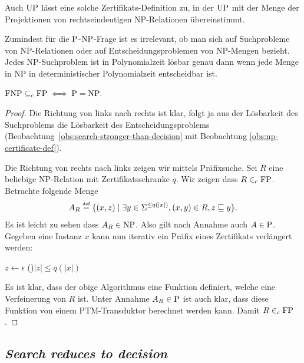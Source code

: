 Auch $\UP$ lässt eine solche Zertifikats-Definition zu, in der $\UP$ mit der Menge der Projektionen von rechtseindeutigen NP-Relationen übereinstimmt.

Zumindest für die $\P$-$\NP$-Frage ist es irrelevant, ob man sich auf Suchprobleme von NP-Relationen oder auf Entscheidungsproblemen von NP-Mengen bezieht. Jedes NP-Suchproblem ist in Polynomialzeit lösbar genau dann wenn jede Menge in NP in deterministischer Polynomialzeit entscheidbar ist.
\begin{lemma}\label{lemma:equiv-p-np-question}
    $\FNP\subseteqc \FP \iff \P = \NP.$
\end{lemma}
\begin{proof}
    Die Richtung von links nach rechts ist klar, folgt ja aus der Lösbarkeit des Suchproblems die Lösbarkeit des Entscheidungsproblems (Beobachtung~\ref{obs:search-stronger-than-decision} mit Beobachtung \ref{obs:np-certificate-def}).

    Die Richtung von rechts nach links zeigen wir mittels Präfixsuche. Sei $R$ eine beliebige NP-Relation mit Zertifikatsschranke $q$. Wir zeigen dass $R\inc\FP$.
    Betrachte folgende Menge
    \[ A_R \defeq \{ (x,z) \mid \exists y\in\Sigma^{\leq q(|x|)}, (x,y)\in R, z\sqsubseteq y \}. \]
    Es ist leicht zu sehen dass $A_R\in\NP$. Also gilt nach Annahme auch $A\in\P$.
    Gegeben eine Instanz $x$ kann nun iterativ ein Präfix eines Zertifikats verlängert werden:\\
    \begin{algorithm}[H]
        $z\gets\epsilon$\;
        \While(){$|z|\leq q(|x|)$}
        {
            \Else{\Reject}
        }
        \Reject
    \end{algorithm}
    \noindent
    Es ist klar, dass der obige Algorithmus eine Funktion definiert, welche eine Verfeinerung von $R$ ist.
    Unter Annahme $A_R\in\P$ ist auch klar, dass diese Funktion von einem PTM-Transduktor berechnet werden kann. Damit $R\inc\FP$.
\end{proof}

\subsection*{\emph{Search reduces to decision}}

